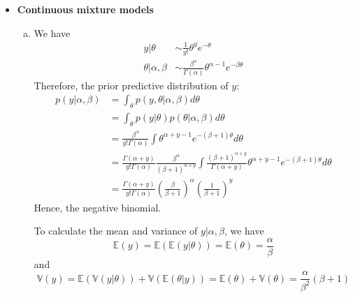 \documentclass{article}
\begin{document}
\begin{itemize}
\item \textbf{Continuous mixture models}
  \begin{enumerate}[(a)]
    \item We have
      \begin{align*}
        y | \theta &\sim \frac{1}{y!} \theta^y e^{-\theta} \\
        \theta | \alpha, \beta &\sim \frac{\beta^{\alpha}}{\Gamma(\alpha)} \theta^{\alpha - 1} e^{-\beta \theta}
      \end{align*}
      Therefore, the prior predictive distribution of $y$:
      \begin{align*}
        p(y | \alpha, \beta) &= \int_{\theta} p(y, \theta | \alpha, \beta) d\theta \\
          &= \int_{\theta} p(y | \theta) p(\theta | \alpha, \beta) d\theta \\
          &= \frac{\beta^{\alpha}}{y!\Gamma(\alpha)} \int \theta^{\alpha + y - 1} e^{-(\beta+1)\theta} d\theta \\
          &= \frac{\Gamma(\alpha+y)}{y!\Gamma(\alpha)} \frac{\beta^{\alpha}}{(\beta + 1)^{\alpha+y}} \int \frac{(\beta+1)^{\alpha+y}}{\Gamma(\alpha+y)} \theta^{\alpha+y-1} e^{-(\beta+1)\theta} d\theta \\
         &= \frac{\Gamma(\alpha + y)}{y! \Gamma(\alpha)} \left( \frac{\beta}{\beta+1} \right)^{\alpha} \left( \frac{1}{\beta+1} \right)^y 
      \end{align*}
      Hence, the negative binomial. 

      To calculate the mean and variance of $y | \alpha, \beta$, we have
      $$
      \mathbb E(y) = \mathbb E \left( \mathbb E(y | \theta) \right) = \mathbb E (\theta) = \frac{\alpha}{\beta}
      $$
      and 
      $$
      \mathbb V(y) = \mathbb E \left( \mathbb V(y | \theta) \right) + \mathbb V \left ( \mathbb E(\theta | y) \right) = \mathbb E (\theta) + \mathbb V(\theta) = \frac{\alpha}{\beta^2} (\beta + 1)
      $$

    \end{enumerate}


\end{itemize}
\end{document}
